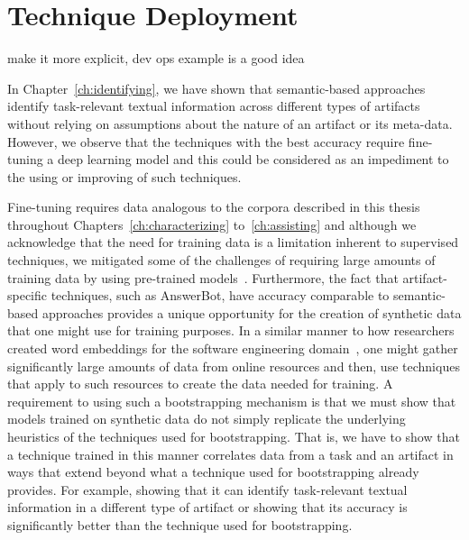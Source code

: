 \section{Technique Deployment}


 


make it more explicit, dev ops example is a good idea

 

In Chapter~\ref{ch:identifying}, we have shown that semantic-based approaches identify task-relevant textual information across
different types of artifacts without relying on
assumptions about the nature of an artifact or its meta-data.
However, we
observe that the techniques with the best accuracy require fine-tuning 
a deep learning model
and this could be considered as an impediment to the using or improving of such  techniques. 


Fine-tuning requires data analogous to the corpora described in this thesis
throughout Chapters~\ref{ch:characterizing} to~\ref{ch:assisting} 
and although we acknowledge that the need for training data is a limitation inherent to supervised techniques,
we mitigated some of the challenges of requiring large amounts of training data by using pre-trained models~\cite{erhan2010pre-train}.
Furthermore, the fact that artifact-specific techniques, such as AnswerBot, have accuracy comparable to semantic-based approaches
 provides
a unique opportunity for the creation of synthetic data that one might use for training purposes.
In a similar manner to how researchers created word embeddings for the software engineering domain~\cite{Efstathiou2018}, one might gather significantly large amounts of data from online resources
and then, use techniques that apply to such resources to create the data needed for training.
A requirement to using such a bootstrapping mechanism is that we must show that models trained on synthetic data do not simply replicate the underlying heuristics of the techniques used for bootstrapping. That is, we have to show that a technique trained
in this manner correlates data from a task and an artifact in ways that
extend beyond what a technique used for bootstrapping already provides. For example, showing that
it can identify task-relevant textual information in a different type of artifact or showing
that its accuracy is significantly better than the technique used for bootstrapping.



